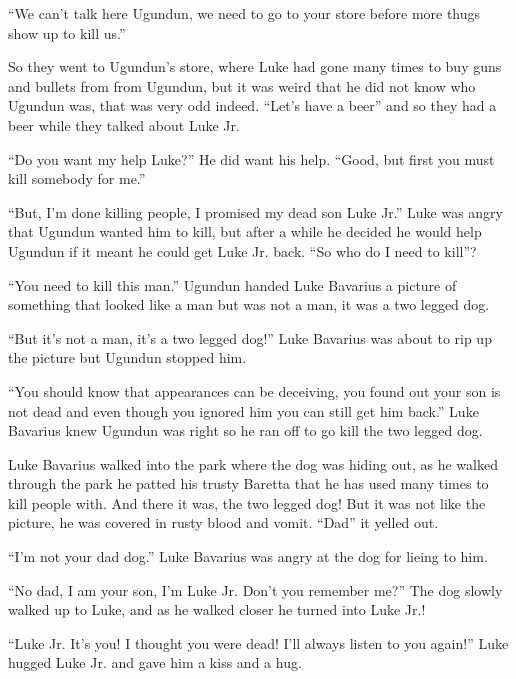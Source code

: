 ``We can't talk here Ugundun, we need to go to your store
before more thugs show up to kill us.''



So they went to Ugundun's store, where Luke had gone many times to
buy guns and bullets from from Ugundun, but it was weird that he
did not know who Ugundun was, that was very odd indeed.
``Let's have a beer'' and so they had a beer while they
talked about Luke Jr.



``Do you want my help Luke?'' He did want his help.
``Good, but first you must kill somebody for me.''



``But, I'm done killing people, I promised my dead son Luke
Jr.'' Luke was angry that Ugundun wanted him to kill, but
after a while he decided he would help Ugundun if it meant he could
get Luke Jr. back. ``So who do I need to kill''?



``You need to kill this man.'' Ugundun handed Luke
Bavarius a picture of something that looked like a man but was not
a man, it was a two legged dog.



``But it's not a man, it's a two legged dog!'' Luke
Bavarius was about to rip up the picture but Ugundun stopped
him.



``You should know that appearances can be deceiving, you found
out your son is not dead and even though you ignored him you can
still get him back.'' Luke Bavarius knew Ugundun was right so
he ran off to go kill the two legged dog.



Luke Bavarius walked into the park where the dog was hiding out, as
he walked through the park he patted his trusty Baretta that he has
used many times to kill people with. And there it was, the two
legged dog! But it was not like the picture, he was covered in
rusty blood and vomit. ``Dad'' it yelled out.



``I'm not your dad dog.'' Luke Bavarius was angry at the
dog for lieing to him.



``No dad, I am your son, I'm Luke Jr. Don't you remember
me?'' The dog slowly walked up to Luke, and as he walked
closer he turned into Luke Jr.!



``Luke Jr. It's you! I thought you were dead! I'll always
listen to you again!'' Luke hugged Luke Jr. and gave him a
kiss and a hug.



